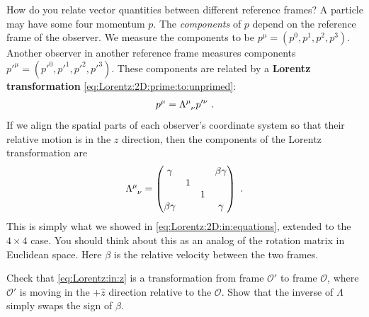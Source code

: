 \documentclass[12pt, oneside]{report}    %
\begin{document}
How do you relate vector quantities between different reference frames? A particle may have some four momentum $p$. The \emph{components} of $p$ depend on the reference frame of the observer. We measure the components to be $p^\mu = (p^0, p^1, p^2, p^3)$. Another observer in another reference frame measures components $p'^\mu=(p'^0, p'^1, p'^2, p'^3)$. These components are related by a \textbf{Lorentz transformation} \eqref{eq:Lorentz:2D:prime:to:unprimed}:
\begin{align}
    p^\mu = \Lambda\aij{\mu}{\nu}p'^\nu \ .
\end{align}
If we align the spatial parts of each observer's coordinate system so that their relative motion is in the $z$ direction, then the components of the Lorentz transformation are
\begin{align}
    \Lambda\aij{\mu}{\nu} =
    \begin{pmatrix}
        \gamma & & & \beta\gamma\\
        & 1 & &  \\
        & & 1 &  \\
        \beta\gamma &  &  & \gamma
    \end{pmatrix}
    \ . 
    \label{eq:Lorentz:in:z}
\end{align}
This is simply what we showed in \eqref{eq:Lorentz:2D:in:equations}, extended to the $4\times 4$ case. You should think about this as an analog of the rotation matrix in Euclidean space. Here $\beta$ is the relative velocity between the two frames. 
\begin{exercise}
Check that \eqref{eq:Lorentz:in:z} is a transformation from frame $\mathcal O'$
 to frame $\mathcal O$, where $\mathcal O'$ is moving in the $+\hat{z}$ direction relative to the $\mathcal O$. Show that the inverse of $\Lambda$ simply swaps the sign of $\beta$. 
\end{exercise}
\end{document}
